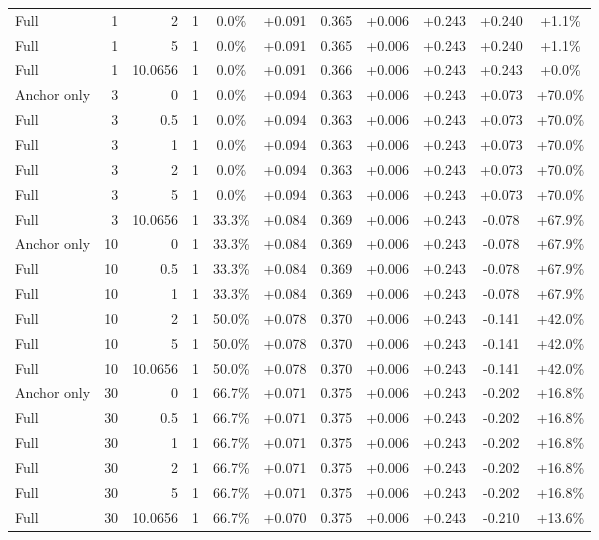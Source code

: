 \begin{table}[htbp]
\begin{tabular}{lrrrccccccc}
Full & 1 & 2 & 1 & 0.0\% & +0.091 & 0.365 & +0.006 & +0.243 & +0.240 & +1.1\% \\
Full & 1 & 5 & 1 & 0.0\% & +0.091 & 0.365 & +0.006 & +0.243 & +0.240 & +1.1\% \\
Full & 1 & 10.0656 & 1 & 0.0\% & +0.091 & 0.366 & +0.006 & +0.243 & +0.243 & +0.0\% \\
Anchor only & 3 & 0 & 1 & 0.0\% & +0.094 & 0.363 & +0.006 & +0.243 & +0.073 & +70.0\% \\
Full & 3 & 0.5 & 1 & 0.0\% & +0.094 & 0.363 & +0.006 & +0.243 & +0.073 & +70.0\% \\
Full & 3 & 1 & 1 & 0.0\% & +0.094 & 0.363 & +0.006 & +0.243 & +0.073 & +70.0\% \\
Full & 3 & 2 & 1 & 0.0\% & +0.094 & 0.363 & +0.006 & +0.243 & +0.073 & +70.0\% \\
Full & 3 & 5 & 1 & 0.0\% & +0.094 & 0.363 & +0.006 & +0.243 & +0.073 & +70.0\% \\
Full & 3 & 10.0656 & 1 & 33.3\% & +0.084 & 0.369 & +0.006 & +0.243 & -0.078 & +67.9\% \\
Anchor only & 10 & 0 & 1 & 33.3\% & +0.084 & 0.369 & +0.006 & +0.243 & -0.078 & +67.9\% \\
Full & 10 & 0.5 & 1 & 33.3\% & +0.084 & 0.369 & +0.006 & +0.243 & -0.078 & +67.9\% \\
Full & 10 & 1 & 1 & 33.3\% & +0.084 & 0.369 & +0.006 & +0.243 & -0.078 & +67.9\% \\
Full & 10 & 2 & 1 & 50.0\% & +0.078 & 0.370 & +0.006 & +0.243 & -0.141 & +42.0\% \\
Full & 10 & 5 & 1 & 50.0\% & +0.078 & 0.370 & +0.006 & +0.243 & -0.141 & +42.0\% \\
Full & 10 & 10.0656 & 1 & 50.0\% & +0.078 & 0.370 & +0.006 & +0.243 & -0.141 & +42.0\% \\
Anchor only & 30 & 0 & 1 & 66.7\% & +0.071 & 0.375 & +0.006 & +0.243 & -0.202 & +16.8\% \\
Full & 30 & 0.5 & 1 & 66.7\% & +0.071 & 0.375 & +0.006 & +0.243 & -0.202 & +16.8\% \\
Full & 30 & 1 & 1 & 66.7\% & +0.071 & 0.375 & +0.006 & +0.243 & -0.202 & +16.8\% \\
Full & 30 & 2 & 1 & 66.7\% & +0.071 & 0.375 & +0.006 & +0.243 & -0.202 & +16.8\% \\
Full & 30 & 5 & 1 & 66.7\% & +0.071 & 0.375 & +0.006 & +0.243 & -0.202 & +16.8\% \\
Full & 30 & 10.0656 & 1 & 66.7\% & +0.070 & 0.375 & +0.006 & +0.243 & -0.210 & +13.6\% \\

\end{tabular}
\end{table}
